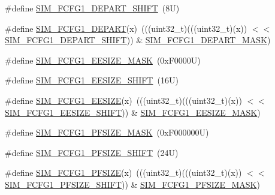 \begin{DoxyCompactItemize}
\#define \mbox{\hyperlink{group___s_i_m___register___masks_ga828f3d67b0fb411b1f32f5ac8105964f}{S\+I\+M\+\_\+\+F\+C\+F\+G1\+\_\+\+D\+E\+P\+A\+R\+T\+\_\+\+S\+H\+I\+FT}}~(8\+U)
\item 
\#define \mbox{\hyperlink{group___s_i_m___register___masks_ga68137c3e32ef5c0477b548ad10de565f}{S\+I\+M\+\_\+\+F\+C\+F\+G1\+\_\+\+D\+E\+P\+A\+RT}}(x)~(((uint32\+\_\+t)(((uint32\+\_\+t)(x)) $<$$<$ \mbox{\hyperlink{group___s_i_m___register___masks_ga828f3d67b0fb411b1f32f5ac8105964f}{S\+I\+M\+\_\+\+F\+C\+F\+G1\+\_\+\+D\+E\+P\+A\+R\+T\+\_\+\+S\+H\+I\+FT}})) \& \mbox{\hyperlink{group___s_i_m___register___masks_ga7b4c8f63810498cd22002a2f3b1bdc0d}{S\+I\+M\+\_\+\+F\+C\+F\+G1\+\_\+\+D\+E\+P\+A\+R\+T\+\_\+\+M\+A\+SK}})
\item 
\#define \mbox{\hyperlink{group___s_i_m___register___masks_gaf02a0b5e053242559c12e5d2834fd3c4}{S\+I\+M\+\_\+\+F\+C\+F\+G1\+\_\+\+E\+E\+S\+I\+Z\+E\+\_\+\+M\+A\+SK}}~(0x\+F0000\+U)
\item 
\#define \mbox{\hyperlink{group___s_i_m___register___masks_ga7e203fc4aaf06a3dbd257768f53dbf83}{S\+I\+M\+\_\+\+F\+C\+F\+G1\+\_\+\+E\+E\+S\+I\+Z\+E\+\_\+\+S\+H\+I\+FT}}~(16\+U)
\item 
\#define \mbox{\hyperlink{group___s_i_m___register___masks_ga8c0cd6c77bd518794e6473dd0a2feca7}{S\+I\+M\+\_\+\+F\+C\+F\+G1\+\_\+\+E\+E\+S\+I\+ZE}}(x)~(((uint32\+\_\+t)(((uint32\+\_\+t)(x)) $<$$<$ \mbox{\hyperlink{group___s_i_m___register___masks_ga7e203fc4aaf06a3dbd257768f53dbf83}{S\+I\+M\+\_\+\+F\+C\+F\+G1\+\_\+\+E\+E\+S\+I\+Z\+E\+\_\+\+S\+H\+I\+FT}})) \& \mbox{\hyperlink{group___s_i_m___register___masks_gaf02a0b5e053242559c12e5d2834fd3c4}{S\+I\+M\+\_\+\+F\+C\+F\+G1\+\_\+\+E\+E\+S\+I\+Z\+E\+\_\+\+M\+A\+SK}})
\item 
\#define \mbox{\hyperlink{group___s_i_m___register___masks_ga5adf627ba4cd9516ebf3e0a6d33aa7c5}{S\+I\+M\+\_\+\+F\+C\+F\+G1\+\_\+\+P\+F\+S\+I\+Z\+E\+\_\+\+M\+A\+SK}}~(0x\+F000000\+U)
\item 
\#define \mbox{\hyperlink{group___s_i_m___register___masks_gaec8960bc114f5539e22701491dcf58f7}{S\+I\+M\+\_\+\+F\+C\+F\+G1\+\_\+\+P\+F\+S\+I\+Z\+E\+\_\+\+S\+H\+I\+FT}}~(24\+U)
\item 
\#define \mbox{\hyperlink{group___s_i_m___register___masks_ga7527f7f4bdcd4c0b2baf6c99a5b6735a}{S\+I\+M\+\_\+\+F\+C\+F\+G1\+\_\+\+P\+F\+S\+I\+ZE}}(x)~(((uint32\+\_\+t)(((uint32\+\_\+t)(x)) $<$$<$ \mbox{\hyperlink{group___s_i_m___register___masks_gaec8960bc114f5539e22701491dcf58f7}{S\+I\+M\+\_\+\+F\+C\+F\+G1\+\_\+\+P\+F\+S\+I\+Z\+E\+\_\+\+S\+H\+I\+FT}})) \& \mbox{\hyperlink{group___s_i_m___register___masks_ga5adf627ba4cd9516ebf3e0a6d33aa7c5}{S\+I\+M\+\_\+\+F\+C\+F\+G1\+\_\+\+P\+F\+S\+I\+Z\+E\+\_\+\+M\+A\+SK}})
$$
\end{DoxyCompactItemize}

